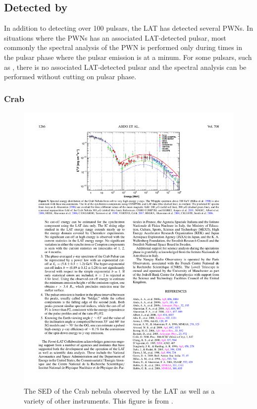 \subsection{ Detected by }

In addition to detecting over 100 pulsars, the \ac{LAT} has detected
several \acp{PWN}.  In situations where the \acp{PWN} has an associated
\ac{LAT}-detected pulsar, most commonly the spectral analysis of the
\ac{PWN} is performed only during times in the pulsar phase where the
pulsar emission is at a minum. For some pulsars, such as ,
there is no associated \ac{LAT}-detected pulsar and the spectral analysis
can be performed without cutting on pulsar phase.

\subsubsection{Crab}

\begin{figure}[htbp]
  \centering
    \includegraphics{chapters/introduction/figures/crab_spectrum.pdf}
  \caption{
    The \ac{SED} of the Crab nebula observed by the \ac{LAT} as
    well as a variety of other instruments.
    This figure is from \cite{abdo_2010a_fermi-large}.
  }
\end{figure}

